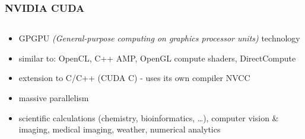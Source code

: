 \documentclass{beamer}
\begin{document}
	\begin{frame}[t,fragile]
		\frametitle{NVIDIA CUDA}
		
	\begin{columns}[onlytextwidth]
		\begin{column}{0.7\textwidth}
		    \begin{itemize}
				\item GPGPU \textit{(General-purpose computing on graphics processor units)} technology
				\item similar to: OpenCL, C++ AMP, OpenGL compute shaders, DirectCompute
				\item extension to C/C++ (CUDA C) - uses its own compiler NVCC
				\item massive parallelism
				\item scientific calculations (chemistry, bioinformatics, \dots), computer vision \& imaging, medical imaging, weather, numerical analytics
			\end{itemize}
		\end{column}


\end{columns}
\end{frame}
\end{document}
